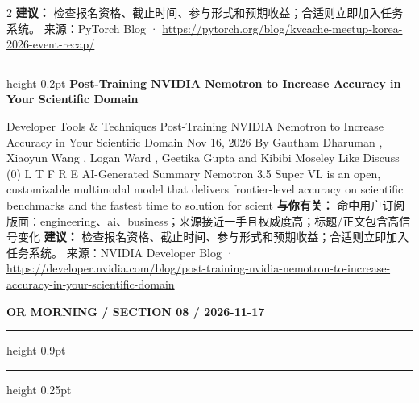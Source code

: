 \documentclass[10.5pt]{ctexart}
\begin{document}
\begin{multicols}{2}
\textbf{建议：} 检查报名资格、截止时间、参与形式和预期收益；合适则立即加入任务系统。
{\footnotesize\color{ormuted} 来源：PyTorch Blog · \url{https://pytorch.org/blog/kvcache-meetup-korea-2026-event-recap/}}
\vspace{2mm}
\hrule height 0.2pt
\vspace{2mm}
{\large\bfseries Post-Training NVIDIA Nemotron to Increase Accuracy in Your Scientific Domain}\par
Developer Tools \& Techniques Post-Training NVIDIA Nemotron to Increase Accuracy in Your Scientific Domain Nov 16, 2026 By Gautham Dharuman , Xiaoyun Wang , Logan Ward , Geetika Gupta and Kibibi Moseley Like Discuss (0) L T F R E AI-Generated Summary Nemotron 3.5 Super VL is an open, customizable multimodal model that delivers frontier-level accuracy on scientific benchmarks and the fastest time to solution for scient
\textbf{与你有关：} 命中用户订阅版面：engineering、ai、business；来源接近一手且权威度高；标题/正文包含高信号变化
\textbf{建议：} 检查报名资格、截止时间、参与形式和预期收益；合适则立即加入任务系统。
{\footnotesize\color{ormuted} 来源：NVIDIA Developer Blog · \url{https://developer.nvidia.com/blog/post-training-nvidia-nemotron-to-increase-accuracy-in-your-scientific-domain}}
\end{multicols}
\newpage
{\small\bfseries OR MORNING / SECTION 08 / 2026-11-17}
\vspace{2mm}
\hrule height 0.9pt
\vspace{1.5mm}
\hrule height 0.25pt
\vspace{4mm}
\end{document}
